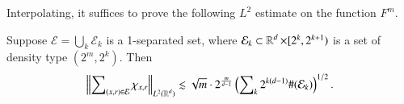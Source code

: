 Interpolating, it suffices to prove the following $L^2$ estimate on the function $F^m$.

\begin{lemma} \label{lemma6}
    Suppose $\mathcal{E} = \bigcup_k \mathcal{E}_k$ is a 1-separated set, where $\mathcal{E}_k \subset \operatorname{\mathbb{R}}^d \times [2^k,2^{k+1})$ is a set of density type $(2^m, 2^k)$. Then
    \[ \left\| \sum\nolimits_{(x,r) \in \mathcal{E}} \chi_{x,r} \right\|_{L^2(\operatorname{\mathbb{R}}^d)} \lesssim \sqrt{m} \cdot 2^{ \frac{m}{d-1} } \left( \sum\nolimits_k 2^{k(d-1)} \#(\mathcal{E}_k) \right)^{1/2}. \]
\end{lemma}


\begin{comment}
\begin{proof}[Proof of Lemma \ref{lemma3} from Lemma \ref{lemma6}]
    Write $F = \sum\nolimits_{(x,r) \in \mathcal{E}_k} \chi_{x,r}$, and then perform a decomposition $\mathcal{E}_k = \bigcup_{m \geq 0} \mathcal{E}_k(2^m)$, and thus define $F = \sum\nolimits_{m \geq 0} F_m$, where
    \[ F_m = \sum\nolimits_{(x,r) \in \mathcal{E}(2^m)} \chi_{x,r}. \]
    We have
    \[ \| F_m \|_{L^2(\RR^d)} \lesssim 2^{\frac{m}{d-1} + \frac{k(d-1)}{2}} \log(2 + 2^m)^{1/2} \cdot \#(\mathcal{E}_k)^{1/2}. \]
    If we interpolate this bound with the support bound for $F_m$, a kind of $L^0$ norm estimate, we conclude that for $0 < p \leq 2$,
    \begin{align*}
        \| F_m \|_{L^p(\RR^d)} &\leq |\text{Supp}(F_m)|^{1/p - 1/2} \| F_m \|_{L^2(\RR^d)}\\
        &\lesssim ( 2^{k(d-1) - m})^{1/p - 1/2} 2^{\frac{m}{d-1} + \frac{k(d-1)}{2}} \log(2 + 2^m)^{1/2} \cdot \#(\mathcal{E}_k)^{1/p} \\
        &\lesssim 2^{m(1/p_d - 1/p)} \log(2 + 2^m)^{1/2} 2^{\frac{k(d-1)}{p}} \#(\mathcal{E}_k)^{1/p}.
    \end{align*}
    where $p_d = 2(d-1)/(d+1)$. This bound is summable in $m$ for $p < p_d$, which enables us to conclude that
    \[ \| F \|_{L^p(\RR^d)} \lesssim 2^{\frac{k(d-1)}{p}} \#(\mathcal{E}_k)^{1/p}. \]
    Thus for $1 \leq p < p_d$, we obtain the bound stated in Lemma \ref{lemma3}.
\end{proof}
\end{comment}

